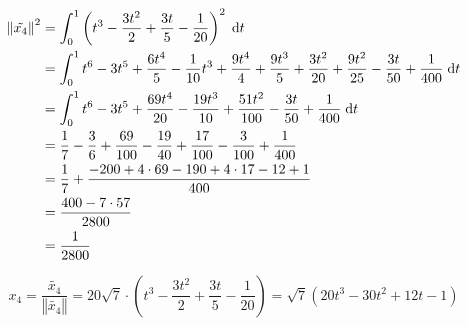 \documentclass{article}
\theoremstyle{definition}
\newcommand{\norm}[1]{\left\Vert #1 \right\Vert}
\begin{document}
\begin{align*}
	\norm{\tilde{x_4}}^2 &= \int_0^1 \left(t^{3} - \frac{3 t^{2}}{2} + \frac{3 t}{5} - \frac{1}{20}\right)^2\d t\\
	&= \int_0^1 t^{6} - 3t^5 + \frac{6t^4}{5} - \frac{1}{10}t^3 + \frac{9t^4}{4} + \frac{9t^3}{5} + \frac{3t^2}{20} + \frac{9t^2}{25} - \frac{3t}{50} + \frac{1}{400}\d t\\
	&= \int_0^1 t^{6} - 3 t^{5} + \frac{69 t^{4}}{20} - \frac{19 t^{3}}{10} + \frac{51 t^{2}}{100} - \frac{3 t}{50} + \frac{1}{400} \d t\\
	&= \frac{1}{7} - \frac{3}{6} + \frac{69}{100} - \frac{19}{40} + \frac{17}{100} - \frac{3}{100} + \frac{1}{400}\\
	&= \frac{1}{7} + \frac{-200 + 4 \cdot 69 - 190 + 4 \cdot 17 - 12 + 1}{400}\\
	&= \frac{400 - 7 \cdot 57}{2800}\\
	&= \frac{1}{2800}
\end{align*}

$$x_4 = \frac{\tilde{x_4}}{\norm{\tilde{x_4}}} = 20 \sqrt{7} \cdot \left(t^{3} - \frac{3 t^{2}}{2} + \frac{3 t}{5} - \frac{1}{20}\right) = \sqrt{7} \left(20 t^{3} - 30 t^{2} + 12 t - 1\right)$$
\end{document}
